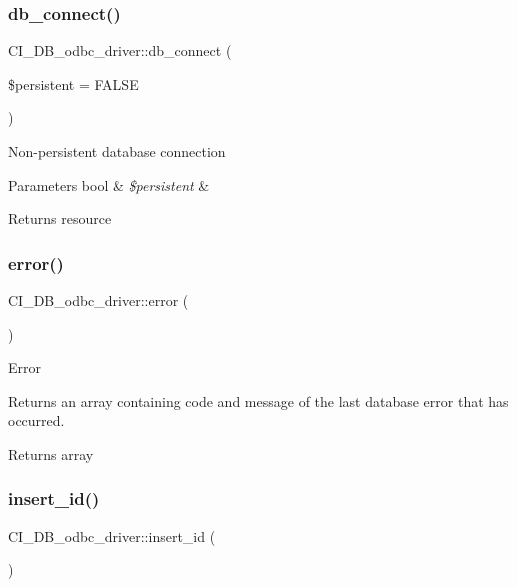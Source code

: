 \subsubsection{\texorpdfstring{db\+\_\+connect()}{db\_connect()}}
{\footnotesize\ttfamily C\+I\+\_\+\+D\+B\+\_\+odbc\+\_\+driver\+::db\+\_\+connect (\begin{DoxyParamCaption}\item[{}]{\$persistent = {\ttfamily FALSE} }\end{DoxyParamCaption})}

Non-\/persistent database connection


\begin{DoxyParams}[1]{Parameters}
bool & {\em \$persistent} & \\
\hline
\end{DoxyParams}
\begin{DoxyReturn}{Returns}
resource 
\end{DoxyReturn}
\mbox{\label{class_c_i___d_b__odbc__driver_a80b31b6166f5a41763f30c377453a656}} 
\subsubsection{\texorpdfstring{error()}{error()}}
{\footnotesize\ttfamily C\+I\+\_\+\+D\+B\+\_\+odbc\+\_\+driver\+::error (\begin{DoxyParamCaption}{ }\end{DoxyParamCaption})}

Error

Returns an array containing code and message of the last database error that has occurred.

\begin{DoxyReturn}{Returns}
array 
\end{DoxyReturn}
\mbox{\label{class_c_i___d_b__odbc__driver_aff1a96e2d3908fc691f202d52fa7e324}} 
\subsubsection{\texorpdfstring{insert\+\_\+id()}{insert\_id()}}
{\footnotesize\ttfamily C\+I\+\_\+\+D\+B\+\_\+odbc\+\_\+driver\+::insert\+\_\+id (\begin{DoxyParamCaption}{ }\end{DoxyParamCaption})}


